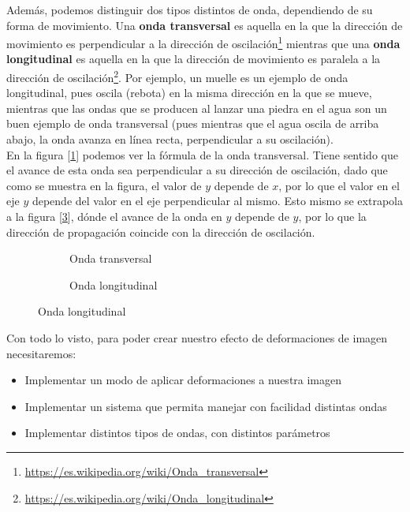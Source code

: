 Además, podemos distinguir dos tipos distintos de onda, dependiendo de su forma de movimiento. Una \textbf{onda transversal} es aquella en la que la dirección de movimiento es perpendicular a la dirección de oscilación\footnote{\url{https://es.wikipedia.org/wiki/Onda_transversal}} mientras que una \textbf{onda longitudinal} es aquella en la que la dirección de movimiento es paralela a la dirección de oscilación\footnote{\url{https://es.wikipedia.org/wiki/Onda_longitudinal}}. Por ejemplo, un muelle es un ejemplo de onda longitudinal, pues oscila (rebota) en la misma dirección en la que se mueve, mientras que las ondas que se producen al lanzar una piedra en el agua son un buen ejemplo de onda transversal (pues mientras que el agua oscila de arriba abajo, la onda avanza en línea recta, perpendicular a su oscilación).\\

En la figura [\ref{fig:transversalwave}] podemos ver la fórmula de la onda transversal. Tiene sentido que el avance de esta onda sea perpendicular a su dirección de oscilación, dado que como se muestra en la figura, el valor de \(y\) depende de \(x\), por lo que el valor en el eje \(y\) depende del valor en el eje perpendicular al mismo. Esto mismo se extrapola a la figura [\ref{fig:longitudinalwave}], dónde el avance de la onda en \(y\) depende de \(y\), por lo que la dirección de propagación coincide con la dirección de oscilación.\\

\begin{figure}[h]
	\centering
	\begin{subfigure}[b]{0.45\textwidth}
		\centering
		\caption{Onda transversal}
		\label{fig:transversalwave}
	\end{subfigure}
	\begin{subfigure}[b]{0.45\textwidth}
		\centering
		\caption{Onda longitudinal}
		\label{fig:longitudinalwave}
	\end{subfigure}
\end{figure}

Con todo lo visto, para poder crear nuestro efecto de deformaciones de imagen necesitaremos:

\begin{itemize}
	\item Implementar un modo de aplicar deformaciones a nuestra imagen 
	\item Implementar un sistema que permita manejar con facilidad distintas ondas	
	\item Implementar distintos tipos de ondas, con distintos parámetros
\end{itemize}

